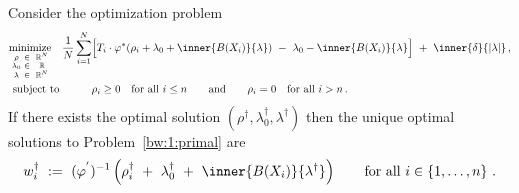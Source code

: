 \begin{ftheorem}
  \label{dual_solution_th}
  Consider the optimization problem
\begin{align}
  \label{dual}
  \begin{split}
  \underset
  {\begin{smallmatrix}
      \rho&\in&&\R^N 
      \\
      \lambda_0 & \in&&\R
      \\
      \lambda&\in&&\R^{N}
  \end{smallmatrix}}
  {
    \mathrm{minimize}
  }
  \quad
  \frac{1}{N}
\sum_{i=1} 
  ^N
  &
  \Big[
  T_i
  \cdot
  \varphi^*
  \!
  \left( 
    \rho_i
    +
\lambda_0
+
\inner
{B(X_i)}
{
\lambda
}
  \right)
  \ 
  -
  \ 
\lambda_0
-
\inner
{B(X_i)}
{
\lambda
}
\Big]
  \ 
+
\ 
\inner
{\delta}
{
  |\lambda|
}
  \,,
  \\
  \mathrm{subject}\ \mathrm{to}
  \quad
  \qquad
  &
  \rho_i \ge 0 
  \quad 
  \mathrm{for}\ \mathrm{all}\ i\le n
  \qquad 
  \mathrm{and}
  \qquad
  \rho_i=0
  \quad 
  \mathrm{for}\ \mathrm{all}\ i>n
  \,.
\end{split}
\end{align}
If there exists the optimal solution 
$
(\rho^\dagger,\lambda_0^\dagger,\lambda^\dagger)
$
then the unique optimal solutions to Problem~\ref{bw:1:primal} are 
\begin{gather*}
  w^\dagger_i
  \ 
  :=
  \ 
  (
  \varphi^{'}
  )^{-1}
  \left(
    \rho^\dagger_i
  \ 
    +
  \ 
\lambda_0^\dagger
  \ 
+
  \ 
\inner
{B(X_i)}
{
\lambda^{\dagger}
}
  \right)
  \qquad
  \text{for all}\ 
  i\in
  \left\{ 1,\ldots,n \right\}
  \,.
\end{gather*}
\end{ftheorem}

